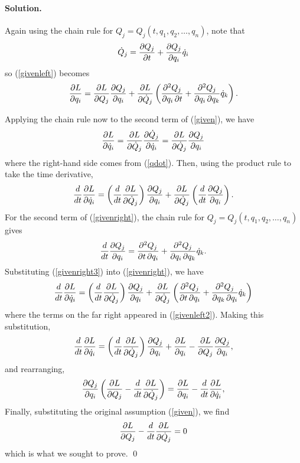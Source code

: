 \documentclass[11pt]{article}
\newcommand{\pder}[2]{\frac{\partial#1}{\partial#2}}
\newcommand{\pmder}[3]{\frac{\partial^2#1}{\partial#2 \, \partial#3}}
\newcommand{\der}[2]{\frac{d#1}{d#2}}
\newcommand{\refeq}[1]{(\ref{#1})}
\newenvironment{solution}
{
    \paragraph{Solution.}
    \ignorespaces
}
{
    \bigskip\bigskip
}
\begin{document}
\begin{enumerate}
\begin{solution}
		Again using the chain rule for $Q_j = Q_j(t, q_1, q_2, \ldots, q_n)$, note that
		\begin{equation} \label{qdot}
			\Qd_j =  \pder{Q_j}{t} + \pder{Q_j}{q_i} \qd_i
		\end{equation}
		so \refeq{givenleft} becomes
		\begin{equation} \label{givenleft2}
			\pder{L}{q_i} = \pder{L}{Q_j} \pder{Q_j}{q_i} + \pder{L}{\Qd_j} \left(\pmder{Q_j}{q_i}{t} + \pmder{Q_j}{q_i}{q_k} \qd_k \right).
		\end{equation}
	
		Applying the chain rule now to the second term of \refeq{given}, we have
		\begin{equation}
			\pder{L}{\qd_i} = \pder{L}{\Qd_j} \pder{\Qd_j}{\qd_i}  = \pder{L}{\Qd_j} \pder{Q_j}{q_i}
		\end{equation}
		where the right-hand side comes from \refeq{qdot}.  Then, using the product rule to take the time derivative,
		\begin{equation} \label{givenright}
			\der{}{t} \pder{L}{\qd_i} = \left( \der{}{t} \pder{L}{\Qd_j} \right) \pder{Q_j}{q_i} + \pder{L}{\Qd_j} \left( \der{}{t} \pder{Q_j}{q_i} \right).
		\end{equation} \label{givenright2}
		For the second term of \refeq{givenright}, the chain rule for $Q_j = Q_j(t, q_1, q_2, \ldots, q_n)$ gives
		\begin{equation} \label{givenright3}
			\der{}{t} \pder{Q_j}{q_i} = \pmder{Q_j}{t}{q_i} + \pmder{Q_j}{q_i}{q_k} \qd_k.
		\end{equation}
		Substituting \refeq{givenright3} into \refeq{givenright}, we have
		\begin{equation}
			\der{}{t} \pder{L}{\qd_i} = \left( \der{}{t} \pder{L}{\Qd_j} \right) \pder{Q_j}{q_i} + \pder{L}{\Qd_j} \left( \pmder{Q_j}{t}{q_i} + \pmder{Q_j}{q_k}{q_i} \qd_k \right)
		\end{equation}
		where the terms on the far right appeared in \refeq{givenleft2}.  Making this substitution,
		\begin{equation}
			\der{}{t} \pder{L}{\qd_i} = \left( \der{}{t} \pder{L}{\Qd_j} \right) \pder{Q_j}{q_i} + \pder{L}{q_i} - \pder{L}{Q_j} \pder{Q_j}{q_i},
		\end{equation}
		and rearranging,
		\begin{equation}
		\pder{Q_j}{q_i} \left( \pder{L}{Q_j} - \der{}{t} \pder{L}{\Qd_j} \right) = \pder{L}{q_i} - \der{}{t} \pder{L}{\qd_i},
		\end{equation}
		Finally, substituting the original assumption \refeq{given}, we find
		\begin{equation}
			\pder{L}{Q_j} - \der{}{t} \pder{L}{\Qd_j} = 0
		\end{equation}
		which is what we sought to prove. \qed
	\end{solution}



\end{enumerate}
\end{document}
